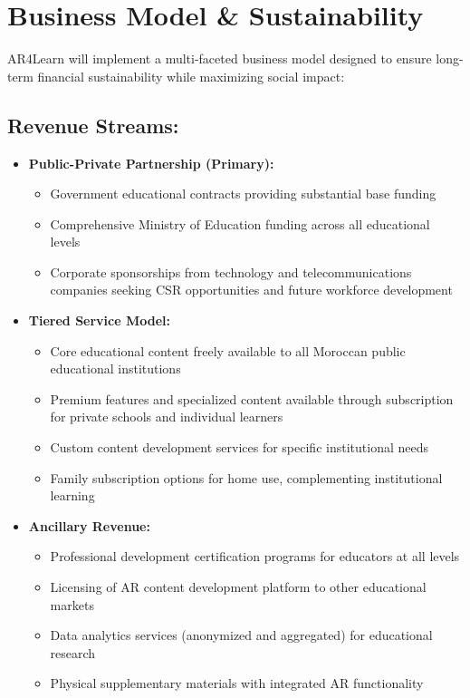\documentclass[11pt,                                          %
a4paper,                                       %
twoside]{report}                               %
\begin{document}
\chapter{Business Model \protect\& Sustainability}



AR4Learn will implement a multi-faceted business model designed to ensure long-term financial sustainability while maximizing social impact:

\section{Revenue Streams:}
\begin{itemize}
	\item \textbf{Public-Private Partnership (Primary):}
	\begin{itemize}
		\item Government educational contracts providing substantial base funding
		\item Comprehensive Ministry of Education funding across all educational levels
		\item Corporate sponsorships from technology and telecommunications companies seeking CSR opportunities and future workforce development
	\end{itemize}
	
	\item \textbf{Tiered Service Model:}
	\begin{itemize}
		\item Core educational content freely available to all Moroccan public educational institutions
		\item Premium features and specialized content available through subscription for private schools and individual learners
		\item Custom content development services for specific institutional needs
		\item Family subscription options for home use, complementing institutional learning
	\end{itemize}
	
	\item \textbf{Ancillary Revenue:}
	\begin{itemize}
		\item Professional development certification programs for educators at all levels
		\item Licensing of AR content development platform to other educational markets
		\item Data analytics services (anonymized and aggregated) for educational research
		\item Physical supplementary materials with integrated AR functionality
	\end{itemize}
\end{itemize}
\end{document}

